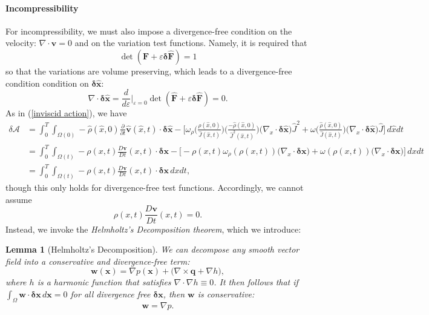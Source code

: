 \documentclass[final,10pt]{article}
\newtheorem{lemma}{Lemma}
\begin{document}
\paragraph{Incompressibility}
For incompressibility, we must also impose a divergence-free condition on the velocity: $\nabla \cdot \bm v = 0$ and on the variation test functions.
Namely, it is required that
\[
	\det( \hat{\bm F} + \varepsilon \bm\delta\hat{\bm F} ) = 1
\]
so that the variations are volume preserving, which leads to a divergence-free condition condition on $\bm\delta\hat{\bm x}$:
\[
	\nabla\cdot\bm\delta\hat{\bm x} = \frac{d}{d\varepsilon}\bigg|_{\varepsilon=0} \det( \hat{\bm F} + \varepsilon\bm\delta\hat{\bm F} ) = 0.
\]
As in (\ref{inviscid action}), we have
\begin{align*}
	\delta \mathcal A &= \int_0^T \int_{\Omega(0)} -\hat{\rho}(\hat{x},0) \frac{\partial}{\partial t}\hat{\bm v}(\hat{x},t)\cdot\bm\delta\hat{\bm x}
							- \bigg[ \omega_\rho\bigg( \frac{\hat{\rho}(\hat{x},0)}{\hat{J}(\hat{x},t)} \bigg) \bigg(\frac{-\hat{\rho}(\hat{x},0)}{\hat{J}^2(\hat{x},t)}\bigg)
								\big(\nabla_{x} \cdot \bm\delta\hat{\bm x}\big)\hat{J}^2
								+ \omega\bigg( \frac{\hat{\rho}(\hat{x},0)}{\hat{J}(\hat{x},t)}\bigg)\big(\nabla_{x} \cdot \bm\delta\hat{\bm x}\big)\hat{J} \bigg] \, d\hat{x}dt
								\nonumber\\
					&= \int_0^T \int_{\Omega(t)} -{\rho}({x},t) \frac{D\bm v}{D t}({x},t)\cdot\bm\delta{\bm x}
							- \bigg[ -\rho(x,t) \omega_\rho({\rho}({x},t))\big(\nabla_{x} \cdot \bm\delta{\bm x}\big)
								+ \omega( \rho({x},t) )\big(\nabla_{x} \cdot \bm\delta{\bm x}\big) \bigg] \, d{x}dt	\\
					&= \int_0^T \int_{\Omega(t)} -{\rho}({x},t) \frac{D\bm v}{D t}({x},t)\cdot\bm\delta{\bm x} \, d{x}dt,
\end{align*}
though this only holds for divergence-free test functions.
Accordingly, we cannot assume 
\[
	{\rho}({x},t) \frac{D\bm v}{D t}({x},t)	= 0.
\]
Instead, we invoke the \emph{Helmholtz's Decomposition theorem}, which we introduce:
\begin{lemma} [Helmholtz's Decomposition]
We can decompose any smooth vector field into a conservative and divergence-free term:
\[
	\bm w(\bm x) = \nabla p(\bm x) + \big( \nabla\times\bm q + \nabla h \big),
\]
where $h$ is a harmonic function that satisfies $\nabla \cdot \nabla h\equiv0$.
It then follows that if $\int_{\Omega} \bm w \cdot \bm\delta\bm x\,d\bm x=0$ for all divergence free $\bm\delta\bm x$, then $\bm w$ is conservative:
\begin{equation}	\label{conservative field}
	\bm w = \nabla p.
\end{equation}
\end{lemma}
\end{document}
